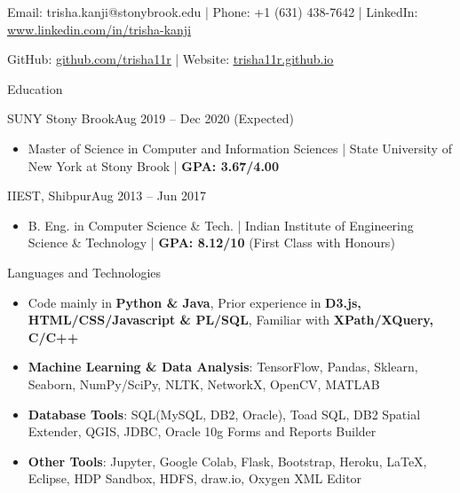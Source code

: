 \documentclass[]{mcdowellcv}
\begin{document}
	\makeheader
    
    \centering Email: trisha.kanji@stonybrook.edu | Phone: +1 (631) 438-7642 | LinkedIn: \underline{\href{https://www.linkedin.com/in/trisha-kanji/}{www.linkedin.com/in/trisha-kanji}}
    
    GitHub: \underline{\href{https://github.com/trisha11r}{github.com/trisha11r}}
    | Website: \underline{\href{https://trisha11r.github.io/}{trisha11r.github.io}}

	\begin{cvsection}{Education}
		\begin{cvsubsection}{SUNY Stony Brook}{}{Aug 2019 -- Dec 2020 (Expected)}
		
		
			\begin{itemize}
				\item Master of Science in Computer and Information Sciences | State University of New York at Stony Brook | \textbf{GPA: 3.67/4.00}
				

			\end{itemize}
		\end{cvsubsection}
		
		\begin{cvsubsection}{IIEST, Shibpur}{}{Aug 2013 -- Jun 2017}
			\begin{itemize}
				\item B. Eng. in Computer Science \& Tech. | Indian Institute of Engineering Science \& Technology | \textbf{GPA: 8.12/10} (First Class with Honours)
				

			\end{itemize}
		\end{cvsubsection}
	\end{cvsection}
	
	\begin{cvsection}{Languages and Technologies}
		\begin{cvsubsection}{}{}{}	
			\begin{itemize}
				\item Code mainly in \textbf{Python \& Java}, Prior experience in \textbf{D3.js, HTML/CSS/Javascript \& PL/SQL}, Familiar with \textbf{XPath/XQuery, C/C++}
				\item \textbf{Machine Learning \& Data Analysis}: TensorFlow, Pandas, Sklearn, Seaborn, NumPy/SciPy, NLTK, NetworkX, OpenCV, MATLAB
				\item \textbf{Database Tools}: SQL(MySQL, DB2, Oracle), Toad SQL, DB2 Spatial Extender, QGIS, JDBC, Oracle 10g Forms and Reports Builder 
				\item  \textbf {Other Tools}: Jupyter, Google Colab, Flask, Bootstrap, Heroku, LaTeX, Eclipse, HDP Sandbox, HDFS, draw.io, Oxygen XML Editor
				
			\end{itemize}
		\end{cvsubsection}
	\end{cvsection}
	
\end{document}
